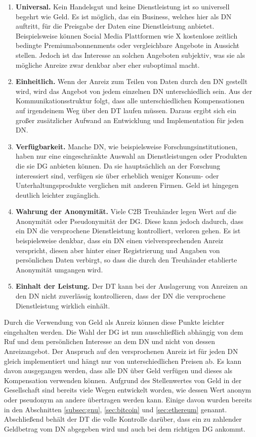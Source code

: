 \documentclass[
	fontsize=11pt,
	headings=small,
	parskip=half,           %
	bibliography=totoc,
	numbers=noenddot,       %
	open=any,               %
]{scrreprt}
\begin{document}
\begin{enumerate}
    \item \textbf{Universal.} Kein Handelsgut und keine Dienstleistung ist so universell begehrt wie Geld. Es ist möglich, das ein Business, welches hier als DN auftritt, für die Preisgabe der Daten eine Dienstleistung anbietet. Beispielsweise können Social Media Plattformen wie X kostenlose zeitlich bedingte Premiumabonnenments oder vergleichbare Angebote in Aussicht stellen. Jedoch ist das Interesse an solchen Angeboten subjektiv, was sie als mögliche Anreize zwar denkbar aber eher suboptimal macht.
    \item \textbf{Einheitlich.} Wenn der Anreiz zum Teilen von Daten durch den DN gestellt wird, wird das Angebot von jedem einzelnen DN unterschiedlich sein. Aus der Kommunikationsstruktur folgt, dass alle unterschiedlichen Kompensationen auf irgendeinem Weg über den DT laufen müssen. Daraus ergibt sich ein großer zusätzlicher Aufwand an Entwicklung und Implementation für jeden DN.
    \item \textbf{Verfügbarkeit.} Manche DN, wie beispielsweise Forschungsinstitutionen, haben nur eine eingeschränkte Auswahl an Dienstleistungen oder Produkten die sie DG anbieten können. Da sie hauptsächlich an der Forschung interessiert sind, verfügen sie über erheblich weniger Konsum- oder Unterhaltungsprodukte verglichen mit anderen Firmen. Geld ist hingegen deutlich leichter zugänglich.
    \item \textbf{Wahrung der Anonymität.} Viele C2B Treuhänder legen Wert auf die Anonymität oder Pseudonymität der DG. Diese kann jedoch dadurch, dass ein DN die versprochene Dienstleistung kontrolliert, verloren gehen. Es ist beispielsweise denkbar, dass ein DN einen vielversprechenden Anreiz verspricht, diesen aber hinter einer Registrierung und Angaben von persönlichen Daten verbirgt, so dass die durch den Treuhänder etablierte Anonymität umgangen wird.
    \item \textbf{Einhalt der Leistung.} Der DT kann bei der Auslagerung von Anreizen an den DN nicht zuverlässig kontrollieren, dass der DN die versprochene Dienstleistung wirklich einhält.
\end{enumerate}
Durch die Verwendung von Geld als Anreiz können diese Punkte leichter eingehalten werden. Die Wahl der DG ist nun ausschließlich abhängig von dem Ruf und dem persönlichen Interesse an dem DN und nicht von dessen Anreizangebot. Der Anspruch auf den versprochenen Anreiz ist für jeden DN gleich implementiert und hängt nur von unterschiedlichen Preisen ab. Es kann davon ausgegangen werden, dass alle DN über Geld verfügen und dieses als Kompensation verwenden können. Aufgrund des Stellenwertes von Geld in der Gesellschaft sind bereits viele Wegen entwickelt worden, wie dessen Wert anonym oder pseudonym an andere übertragen werden kann. Einige davon wurden bereits in den Abschnitten \ref{subsec:gnu}, \ref{sec:bitcoin} und \ref{sec:ethereum} genannt. Abschließend behält der DT die volle Kontrolle darüber, dass ein zu zahlender Geldbetrag vom DN abgegeben wird und auch bei dem richtigen DG ankommt.
\end{document}
